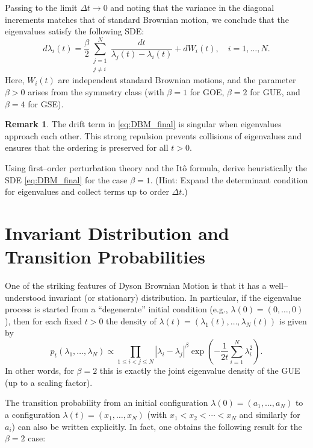 \documentclass[letterpaper,11pt,oneside,reqno]{article}
\numberwithin{equation}{section}
\theoremstyle{definition}
\newtheorem{remark}[proposition]{Remark}
\begin{document}
Passing to the limit \(\Delta t\to 0\) and noting that the variance in the diagonal increments matches that of standard Brownian motion, we conclude that the eigenvalues satisfy the following SDE:
\begin{equation}
\label{eq:DBM_final}
d\lambda_i(t)=\frac{\beta}{2}\sum_{\substack{j=1\\ j\neq i}}^N \frac{dt}{\lambda_j(t)-\lambda_i(t)}+dW_i(t), \quad i=1,\dots,N.
\end{equation}
Here, \(W_i(t)\) are independent standard Brownian motions, and the parameter \(\beta>0\) arises from the symmetry class (with \(\beta=1\) for GOE, \(\beta=2\) for GUE, and \(\beta=4\) for GSE).

\begin{remark}
The drift term in \eqref{eq:DBM_final} is singular when eigenvalues approach each other. This strong repulsion prevents collisions of eigenvalues and ensures that the ordering is preserved for all \(t>0\).
\end{remark}

\begin{exercise}
Using first–order perturbation theory and the Itô formula, derive heuristically the SDE \eqref{eq:DBM_final} for the case \(\beta=1\). (Hint: Expand the determinant condition for eigenvalues and collect terms up to order \(\Delta t\).)
\end{exercise}

\section{Invariant Distribution and Transition Probabilities}

One of the striking features of Dyson Brownian Motion is that it has a well–understood invariant (or stationary) distribution. In particular, if the eigenvalue process is started from a “degenerate” initial condition (e.g., \(\lambda(0)=(0,\dots,0)\)), then for each fixed \(t>0\) the density of \(\lambda(t)=(\lambda_1(t),\dots,\lambda_N(t))\) is given by
\[
p_t(\lambda_1,\dots,\lambda_N) \propto \prod_{1\le i<j\le N}|\lambda_i-\lambda_j|^\beta \exp\left(-\frac{1}{2t}\sum_{i=1}^N\lambda_i^2\right).
\]
In other words, for \(\beta=2\) this is exactly the joint eigenvalue density of the GUE (up to a scaling factor).

The transition probability from an initial configuration \(\lambda(0)=(a_1,\dots,a_N)\) to a configuration \(\lambda(t)=(x_1,\dots,x_N)\) (with \(x_1<x_2<\cdots<x_N\) and similarly for \(a_i\)) can also be written explicitly. In fact, one obtains the following result for the \(\beta=2\) case:
\end{document}
